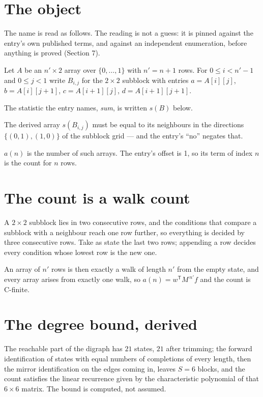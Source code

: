 \documentclass[11pt]{article}
\theoremstyle{definition}
\begin{document}
\section{The object}

The name is read as follows. The reading is not a guess: it is pinned against the entry's own published terms, and against an independent enumeration, before anything is proved (Section 7).

Let $A$ be an $n' \times 2$ array over $\{0,\dots,1\}$ with $n' = n + 1$ rows. For $0 \le i < n'-1$ and $0 \le j < 1$ write $B_{i,j}$ for the $2\times2$ subblock with entries $a = A[i][j]$, $b = A[i][j{+}1]$, $c = A[i{+}1][j]$, $d = A[i{+}1][j{+}1]$.

The statistic the entry names, {\itshape sum}, is written $s(B)$ below.

The derived array $s(B_{i,j})$ must be equal to its neighbours in the directions $\{(0,1), (1,0)\}$ of the subblock grid --- and the entry's ``no'' negates that.

$a(n)$ is the number of such arrays. The entry's offset is 1, so its term of index $n$ is the count for $n$ rows.

\section{The count is a walk count}

A $2\times2$ subblock lies in two consecutive rows, and the conditions that compare a subblock with a neighbour reach one row further, so everything is decided by three consecutive rows. Take as state the last two rows; appending a row decides every condition whose lowest row is the new one.

An array of $n'$ rows is then exactly a walk of length $n'$ from the empty state, and every array arises from exactly one walk, so $a(n) = w^{\mathsf T}M^{\,n'}f$ and the count is C-finite.

\section{The degree bound, derived}

The reachable part of the digraph has $21$ states, $21$ after trimming; the forward identification of states with equal numbers of completions of every length, then the mirror identification on the edges coming in, leaves $S = 6$ blocks, and the count satisfies the linear recurrence given by the characteristic polynomial of that $6\times6$ matrix. The bound is computed, not assumed.
\end{document}
